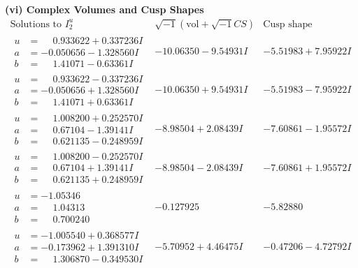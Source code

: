 \documentclass[1p]{elsarticle_modified}
\theoremstyle{definition}
\newcommand{\I}{\sqrt{-1}}
\begin{document}
\newpage\flushleft \textbf{(vi) Complex Volumes and Cusp Shapes}
$$\begin{array}{c|c|c}  
\text{Solutions to }I^u_{2}& \I (\text{vol} + \sqrt{-1}CS) & \text{Cusp shape}\\
 \hline 
\begin{aligned}
u &= \phantom{-}0.933622 + 0.337236 I \\
a &= -0.050656 - 1.328560 I \\
b &= \phantom{-}1.41071 - 0.63361 I\end{aligned}
 & -10.06350 - 9.54931 I & -5.51983 + 7.95922 I \\ \hline\begin{aligned}
u &= \phantom{-}0.933622 - 0.337236 I \\
a &= -0.050656 + 1.328560 I \\
b &= \phantom{-}1.41071 + 0.63361 I\end{aligned}
 & -10.06350 + 9.54931 I & -5.51983 - 7.95922 I \\ \hline\begin{aligned}
u &= \phantom{-}1.008200 + 0.252570 I \\
a &= \phantom{-}0.67104 - 1.39141 I \\
b &= \phantom{-}0.621135 - 0.248959 I\end{aligned}
 & -8.98504 + 2.08439 I & -7.60861 - 1.95572 I \\ \hline\begin{aligned}
u &= \phantom{-}1.008200 - 0.252570 I \\
a &= \phantom{-}0.67104 + 1.39141 I \\
b &= \phantom{-}0.621135 + 0.248959 I\end{aligned}
 & -8.98504 - 2.08439 I & -7.60861 + 1.95572 I \\ \hline\begin{aligned}
u &= -1.05346\phantom{ +0.000000I} \\
a &= \phantom{-}1.04313\phantom{ +0.000000I} \\
b &= \phantom{-}0.700240\phantom{ +0.000000I}\end{aligned}
 & -0.127925\phantom{ +0.000000I} & -5.82880\phantom{ +0.000000I} \\ \hline\begin{aligned}
u &= -1.005540 + 0.368577 I \\
a &= -0.173962 + 1.391310 I \\
b &= \phantom{-}1.306870 - 0.349530 I\end{aligned}
 & -5.70952 + 4.46475 I & -0.47206 - 4.72792 I \\ \hline\begin{aligned}

\end{aligned}
\end{array}$$
\end{document}

